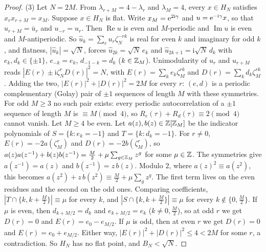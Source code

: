 \begin{proof}
(3) Let $N=2M$. From $\lambda_{r+M}=4-\lambda_r$ and $\lambda_M=4$, every $x\in H_N$ satisfies
$x_rx_{r+M}=x_M$. Suppose $x\in H_N$ is flat. Write $x_M=\mathrm{e}^{2\mathrm i\gamma}$ and $u=\mathrm{e}^{-\mathrm i\gamma}x$, so
that $u_{r+M}=\bar u_r$ and $u_{-r}=u_r$. Then $\operatorname{Re}u$ is even and $M$-periodic and
$\operatorname{Im}u$ is even and $M$-antiperiodic. So $\hat u_k=\sum_ru_r\zeta_N^{-rk}$ is real for even $k$ and
imaginary for odd $k$, and flatness, $|\hat u_k|=\sqrt N$, forces $\hat u_{2k}=\sqrt N\,e_k$ and
$\hat u_{2k+1}=\mathrm i\sqrt N\,d_k$ with $e_k,d_k\in\{\pm1\}$, $e_{-k}=e_k$, $d_{-1-k}=d_k$ ($k\in\mathbb{Z}_M$).
Unimodularity of $u_r$ and $u_{r+M}$ reads $|E(r)\pm\mathrm i\zeta_N^rD(r)|^2=N$, with
$E(r)=\sum_ke_k\zeta_M^{rk}$ and $D(r)=\sum_kd_k\zeta_M^{rk}$. Adding the two, $|E(r)|^2+|D(r)|^2=2M$ for
every $r$: $(e,d)$ is a periodic complementary (Golay) pair of $\pm1$ sequences of length $M$ with these
symmetries. For odd $M\ge3$ no such pair exists: every periodic autocorrelation of a $\pm1$ sequence of
length $M$ is $\equiv M\pmod4$, so $R_e(\tau)+R_d(\tau)\equiv2\pmod4$ cannot vanish. Let $M\ge4$ be even.
Let $a(z),b(z)\in\mathbb{Z}[\mathbb{Z}_M]$ be the indicator polynomials of $S=\{k:e_k=-1\}$ and $T=\{k:d_k=-1\}$. For
$r\ne0$, $E(r)=-2a(\zeta_M^r)$ and $D(r)=-2b(\zeta_M^r)$, so
$a(z)a(z^{-1})+b(z)b(z^{-1})=\tfrac M2+\mu\sum_{g\in\mathbb{Z}_M}z^g$ for some $\mu\in\mathbb{Z}$. The symmetries give
$a(z^{-1})=a(z)$ and $b(z^{-1})=z\,b(z)$. Modulo $2$, where $a(z)^2\equiv a(z^2)$, this becomes
$a(z^2)+z\,b(z^2)\equiv\tfrac M2+\mu\sum_gz^g$. The first term lives on the even residues and the second on
the odd ones. Comparing coefficients, $|T\cap\{k,k+\tfrac M2\}|\equiv\mu$ for every $k$, and
$|S\cap\{k,k+\tfrac M2\}|\equiv\mu$ for every $k\notin\{0,\tfrac M2\}$. If $\mu$ is even, then
$d_{k+M/2}=d_k$ and $e_{k+M/2}=e_k$ ($k\ne0,\tfrac M2$), so at odd $r$ we get $D(r)=0$ and
$E(r)=e_0-e_{M/2}$. If $\mu$ is odd, then at even $r$ we get $D(r)=0$ and $E(r)=e_0+e_{M/2}$. Either
way, $|E(r)|^2+|D(r)|^2\le4<2M$ for some $r$, a contradiction. So $H_N$ has no flat point, and
$B_N<\sqrt N$.


\end{proof}
